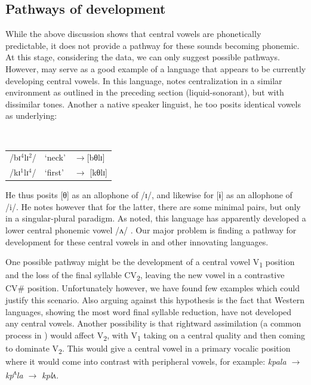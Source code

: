\documentclass[output=paper,newtxmath,modfonts,nonflat,draft]{langsci/langscibook}
\begin{document}
\subsection{Pathways of development}\label{sec:zogbo:4.2} 

While the above discussion shows that central vowels are phonetically predictable, it does not provide a pathway for these sounds becoming phonemic.  At this stage, considering the data, we can only suggest possible pathways.  However,  may serve as a good example of a language that appears to be currently developing central vowels.  In this language, \citet[191]{Goprou2014} notes centralization in a similar environment as outlined in the preceding section (liquid-sonorant), but with dissimilar tones. Another a native speaker linguist, he too posits identical vowels as underlying:

\ea {}\\
\begin{tabular}{lll}
/bɪ$^4$lɪ$^2$/ & ‘neck’ & $\rightarrow$[bθlɪ]\\
/kɪ$^1$lɪ$^4$/ & ‘first’ & $\rightarrow$ [kθlɪ]\\
\end{tabular}
\z

He thus posits [θ] as an allophone of /ɪ/, and likewise for [ɨ] as an allophone of /i/.  He notes however that for the latter, there are some minimal pairs, but only in a singular-plural paradigm. As noted, this language has apparently developed a lower central phonemic vowel /ʌ/ \citep{Vahoua2011}. Our major problem is finding a pathway for development for these central vowels in  and other innovating languages. 

One possible pathway might be the development of a central vowel V\textsubscript{1} position and the loss of the final syllable CV\textsubscript{2}, leaving the new vowel in a contrastive CV\# position.  Unfortunately however, we have found few examples which could justify this scenario. Also arguing against this hypothesis is the fact that Western languages, showing the most word final syllable reduction, have not developed any central vowels.  Another possibility is that rightward assimilation (a common  process in ) would affect V\textsubscript{2}, with V\textsubscript{1} taking on a central quality and then coming to dominate V\textsubscript{2}. This would give a central vowel in a primary vocalic position where it would come into contrast with peripheral vowels, for example:  \textit{kpala $\rightarrow$  kp\textsuperscript{ʌ}}\textit{la $\rightarrow$ kplʌ.}
\end{document}
